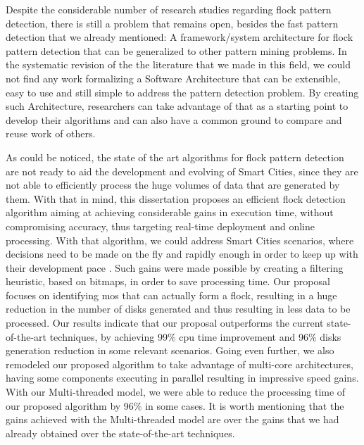 Despite the considerable number of research studies regarding flock pattern detection, there is still a
problem that remains open, besides the fast pattern detection that we already mentioned: A framework/system architecture
%
%
%
for flock pattern detection that can be generalized to other pattern mining problems. In the systematic revision of the
the literature that we made in this field, we could not find any work formalizing a Software Architecture that can be
extensible, easy to use and still simple to address the pattern detection problem. By creating such Architecture,
researchers can take advantage of that as a starting point to develop their algorithms and can also have a common ground
to compare and reuse work of others.

As could be noticed, the state of the art algorithms for flock pattern detection are not ready to aid the development
and evolving of Smart Cities, since they are not able to efficiently process the huge volumes of data that are generated
by them. With that in mind, this dissertation proposes an efficient flock detection algorithm aiming at achieving
considerable gains in execution time, without compromising accuracy, thus targeting real-time deployment and online
processing. With that algorithm, we could address Smart Cities scenarios, where decisions need to be made on the fly and
rapidly enough in order to keep up with their development pace \citep{ieeesmartcities}\citep{springersmartcities}. Such
gains were made possible by creating a filtering heuristic, based on bitmaps, in order to save processing time. Our
proposal focuses on identifying \acp{mo} that can actually form a flock, resulting in a huge reduction
in the number of disks generated and thus resulting in less data to be processed. Our results indicate that our proposal
outperforms the current state-of-the-art techniques, by achieving 99\% \ac{cpu} time improvement and 96\% disks
generation reduction in some relevant scenarios. Going even further, we also remodeled our proposed algorithm to take
advantage of multi-core architectures, having some components executing in parallel resulting in impressive speed gains.
With our Multi-threaded model, we were able to reduce the processing time of our proposed algorithm by 96\% in some
cases. It is worth mentioning that the gains achieved with the Multi-threaded model are over the gains that we had
already obtained over the state-of-the-art techniques.

